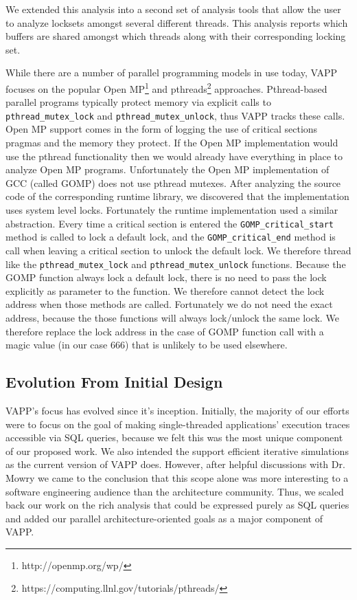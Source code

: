 We extended this analysis into a second set of analysis tools that allow the
user to analyze locksets amongst several different threads. This analysis
reports which buffers are shared amongst which threads along with
their corresponding locking set.

While there are a number of parallel programming models in use today,
VAPP focuses on the popular Open MP\footnote{http://openmp.org/wp/} and
pthreads\footnote{https://computing.llnl.gov/tutorials/pthreads/}
approaches.  Pthread-based parallel programs typically protect memory
via explicit calls to \texttt{pthread\_mutex\_lock} and
\texttt{pthread\_mutex\_unlock}, thus VAPP tracks these calls.  Open MP
support comes in the form of logging the use of critical sections
pragmas and the memory they protect. If the Open MP implementation
would use the pthread functionality then we would already have
everything in place to analyze Open MP programs. Unfortunately
the Open MP implementation of GCC (called GOMP) does not use pthread
mutexes. After analyzing the source code of the corresponding runtime
library, we discovered that the implementation uses system level
locks. Fortunately the runtime implementation used a similar
abstraction. Every time a critical section is entered the
\texttt{GOMP\_critical\_start} method is called to lock a default
lock, and the \texttt{GOMP\_critical\_end} method is call when leaving
a critical section to unlock the default lock. We therefore thread
like the \texttt{pthread\_mutex\_lock} and
\texttt{pthread\_mutex\_unlock} functions. Because the GOMP function
always lock a default lock, there is no need to pass the lock explicitly
as parameter to the function. We therefore cannot detect the lock
address when those methods are called. Fortunately we do not need the
exact address, because the those functions will always lock/unlock the
same lock. We therefore replace the lock address in the case of GOMP
function call with a magic value (in our case 666) that is unlikely
to be used elsewhere.

\subsection{Evolution From Initial Design}
VAPP's focus has evolved since it's inception.  Initially, the
majority of our efforts were to focus on the goal of making
single-threaded applications' execution traces accessible via SQL
queries, because we felt this was the most unique component of our
proposed work.  We also intended the support efficient iterative
simulations as the current version of VAPP does.  However, after
helpful discussions with Dr. Mowry we came to the conclusion that this
scope alone was more interesting to a software engineering audience
than the architecture community.  Thus, we scaled back our work on the
rich analysis that could be expressed purely as SQL queries and added
our parallel architecture-oriented goals as a major component of VAPP.

